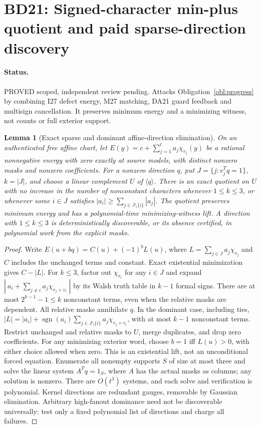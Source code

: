 \documentclass[11pt]{article}
\newtheorem{lemma}[theorem]{Lemma}
\begin{document}
\section{BD21: Signed-character min-plus quotient and paid sparse-direction discovery}\label{sec:bd21}
\paragraph{Status.} PROVED scoped, independent review pending. Attacks Obligation~\ref{obl:progress} by combining I27 defect energy, M27 matching, DA21 guard feedback and multisign cancellation. It preserves minimum energy and a minimizing witness, not counts or full exterior support.
\begin{lemma}[Exact sparse and dominant affine-direction elimination]\label{lem:bd21-min}
On an authenticated free affine chart, let $E(y)=c+\sum_{j=1}^t a_j\chi_{v_j}(y)$ be a rational nonnegative energy with zero exactly at source models, with distinct nonzero masks and nonzero coefficients. For a nonzero direction $q$, put $J=\{j:v_j^Tq=1\}$, $k=|J|$, and choose a linear complement $U$ of $\langle q\rangle$. There is an exact quotient on $U$ with no increase in the number of nonconstant characters whenever $1\le k\le3$, or whenever some $i\in J$ satisfies $|a_i|\ge\sum_{j\in J\setminus\{i\}}|a_j|$. The quotient preserves minimum energy and has a polynomial-time minimizing-witness lift. A direction with $1\le k\le3$ is deterministically discoverable, or its absence certified, in polynomial work from the explicit masks.
\end{lemma}
\begin{proof}
Write $E(u+bq)=C(u)+(-1)^b L(u)$, where $L=\sum_{j\in J}a_j\chi_{v_j}$ and $C$ includes the unchanged terms and constant. Exact existential minimization gives $C-|L|$. For $k\le3$, factor out $\chi_{v_i}$ for any $i\in J$ and expand $|\ a_i+\sum_{j\ne i}a_j\chi_{v_j+v_i}\ |$ by its Walsh truth table in $k-1$ formal signs. There are at most $2^{k-1}-1\le k$ nonconstant terms, even when the relative masks are dependent. All relative masks annihilate $q$. In the dominant case, including ties, $|L|=|a_i|+\operatorname{sgn}(a_i)\sum_{j\in J\setminus\{i\}}a_j\chi_{v_j+v_i}$, with at most $k-1$ nonconstant terms. Restrict unchanged and relative masks to $U$, merge duplicates, and drop zero coefficients. For any minimizing exterior word, choose $b=1$ iff $L(u)>0$, with either choice allowed when zero. This is an existential lift, not an unconditional forced equation. Enumerate all nonempty supports $S$ of size at most three and solve the linear system $A^Tq=1_S$, where $A$ has the actual masks as columns; any solution is nonzero. There are $O(t^3)$ systems, and each solve and verification is polynomial. Kernel directions are redundant gauges, removable by Gaussian elimination. Arbitrary high-fanout dominance need not be discoverable universally: test only a fixed polynomial list of directions and charge all failures.
\end{proof}
\end{document}
